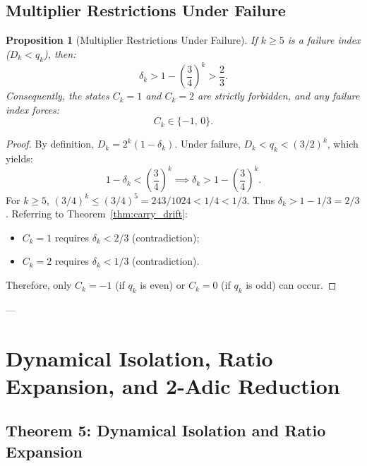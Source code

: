 \documentclass[11pt,reqno]{amsart}
\newtheorem{proposition}[theorem]{Proposition}
\theoremstyle{definition}
\numberwithin{equation}{section}
\begin{document}
\subsection{Multiplier Restrictions Under Failure}

\begin{proposition}[Multiplier Restrictions Under Failure]\label{prop:multiplier_restrictions}
If $k \ge 5$ is a failure index ($D_k < q_k$), then:
\begin{equation}\label{eq:delta_floor}
\delta_k > 1 - \left(\frac{3}{4}\right)^k > \frac{2}{3}.
\end{equation}
Consequently, the states $C_k = 1$ and $C_k = 2$ are strictly forbidden, and any failure index forces:
\begin{equation}
C_k \in \{-1, \, 0\}.
\end{equation}
\end{proposition}

\begin{proof}
By definition, $D_k = 2^k(1 - \delta_k)$. Under failure, $D_k < q_k < (3/2)^k$, which yields:
\[
1 - \delta_k < \left(\frac{3}{4}\right)^k \implies \delta_k > 1 - \left(\frac{3}{4}\right)^k.
\]
For $k \ge 5$, $(3/4)^k \le (3/4)^5 = 243/1024 < 1/4 < 1/3$. Thus $\delta_k > 1 - 1/3 = 2/3$.
Referring to Theorem~\ref{thm:carry_drift}:
\begin{itemize}
    \item $C_k = 1$ requires $\delta_k < 2/3$ (contradiction);
    \item $C_k = 2$ requires $\delta_k < 1/3$ (contradiction).
\end{itemize}
Therefore, only $C_k = -1$ (if $q_k$ is even) or $C_k = 0$ (if $q_k$ is odd) can occur.
\end{proof}

---

\section{Dynamical Isolation, Ratio Expansion, and 2-Adic Reduction}

\subsection{Theorem 5: Dynamical Isolation and Ratio Expansion}\label{sec:repulsion}
\end{document}
